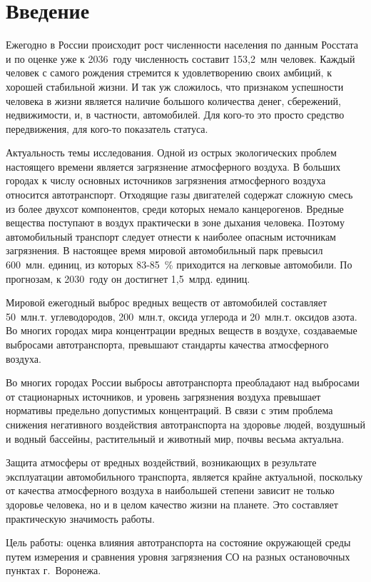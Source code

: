 
\section*{Введение}

Ежегодно в России происходит рост численности населения по данным Росстата и по оценке уже к 2036~году численность составит 153,2~млн человек. Каждый человек с самого рождения стремится к удовлетворению своих амбиций, к хорошей стабильной жизни. И так уж сложилось, что  признаком успешности человека в жизни является наличие большого количества денег, сбережений, недвижимости, и, в частности, автомобилей. Для кого-то это просто средство передвижения, для кого-то показатель статуса.

Актуальность темы исследования. Одной из острых экологических проблем настоящего времени является загрязнение атмосферного воздуха. В больших городах к числу основных источников загрязнения атмосферного воздуха относится автотранспорт. Отходящие газы двигателей содержат сложную смесь из более двухсот компонентов, среди которых немало канцерогенов. Вредные вещества поступают в воздух практически в зоне дыхания человека. Поэтому автомобильный транспорт следует отнести к наиболее опасным источникам загрязнения. В настоящее время мировой автомобильный парк превысил 600~млн. единиц, из которых 83-85~\% приходится на легковые автомобили. По прогнозам, к 2030~году он достигнет 1,5~млрд. единиц.

Мировой ежегодный выброс вредных веществ от автомобилей составляет 50~млн.т. углеводородов, 200~млн.т, оксида углерода и 20~млн.т. оксидов азота. Во многих городах мира концентрации вредных веществ в воздухе, создаваемые выбросами автотранспорта, превышают стандарты качества атмосферного воздуха.

Во многих городах России выбросы автотранспорта преобладают над выбросами от стационарных источников, и уровень загрязнения воздуха превышает нормативы предельно допустимых концентраций. В связи с этим проблема снижения негативного воздействия автотранспорта на здоровье людей, воздушный и водный бассейны, растительный и животный мир, почвы весьма актуальна.

Защита атмосферы от вредных воздействий, возникающих в результате эксплуатации автомобильного транспорта, является крайне актуальной, поскольку от качества атмосферного воздуха в наибольшей степени зависит не только здоровье человека, но и в целом качество жизни на планете. Это составляет практическую значимость работы.

Цель работы: оценка влияния автотранспорта на состояние окружающей среды путем измерения и сравнения уровня загрязнения СО на разных остановочных пунктах г.~Воронежа.

